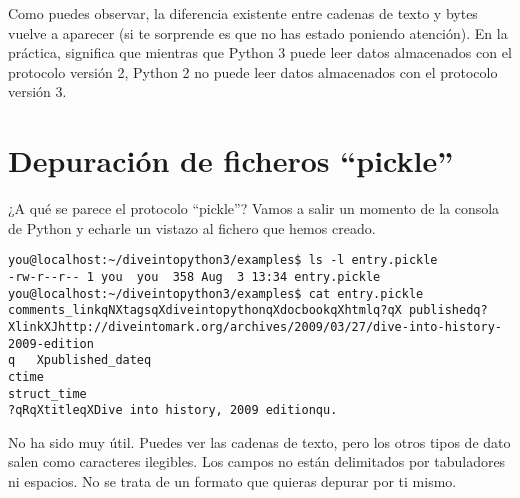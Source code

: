 Como puedes observar, la diferencia existente entre cadenas de texto y bytes vuelve a aparecer (si te sorprende es que no has estado poniendo atención). En la práctica, significa que mientras que Python 3 puede leer datos almacenados con el protocolo versión 2, Python 2 no puede leer datos almacenados con el protocolo versión 3.

\section{Depuración de ficheros ``pickle''}

¿A qué se parece el protocolo ``pickle''? Vamos a salir un momento de la consola de Python y echarle un vistazo al fichero  que hemos creado.

\noindent\begin{minipage}{\textwidth}
\begin{lstlisting}[mathescape=False]
you@localhost:~/diveintopython3/examples$ ls -l entry.pickle
-rw-r--r-- 1 you  you  358 Aug  3 13:34 entry.pickle
you@localhost:~/diveintopython3/examples$ cat entry.pickle
comments_linkqNXtagsqXdiveintopythonqXdocbookqXhtmlq?qX publishedq?
XlinkXJhttp://diveintomark.org/archives/2009/03/27/dive-into-history-
2009-edition
q   Xpublished_dateq
ctime
struct_time
?qRqXtitleqXDive into history, 2009 editionqu.
\end{lstlisting}
\end{minipage}

No ha sido muy útil. Puedes ver las cadenas de texto, pero los otros tipos de dato salen como caracteres ilegibles. Los campos no están delimitados por tabuladores ni espacios. No se trata de un formato que quieras depurar por ti mismo.

